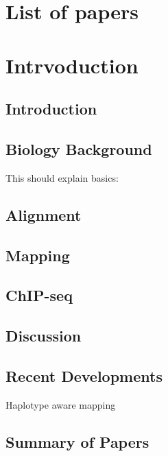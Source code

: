 \chapter{List of papers}
\chapter{Intrvoduction}
\section{Introduction}

\section{Biology Background}

This should explain basics:
\section{Alignment}

\section{Mapping}

\section{ChIP-seq}

\section{Discussion}

\section{Recent Developments}
Haplotype aware mapping 
\section{Summary of Papers}
% 
% 
% 
% 
% 
% 
\clearpage
% 


